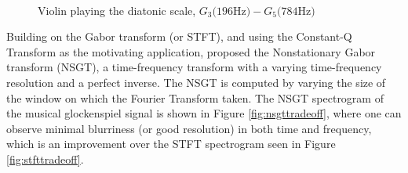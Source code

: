 \documentclass[report.tex]{subfiles}
\begin{document}
\begin{figure}[ht]
	\centering
	\\
	\caption{Violin playing the diatonic scale, $G_{3} \text{(196Hz)} - G_{5} \text{(784Hz)}$ \parencite[430]{jbrown}}
	\label{fig:violin}
\end{figure}

Building on the Gabor transform (or STFT), and using the Constant-Q Transform as the motivating application, \textcite{balazs} proposed the Nonstationary Gabor transform (NSGT), a time-frequency transform with a varying time-frequency resolution and a perfect inverse. The NSGT is computed by varying the size of the window on which the Fourier Transform taken. The NSGT spectrogram of the musical glockenspiel signal is shown in Figure \ref{fig:nsgttradeoff}, where one can observe minimal blurriness (or good resolution) in both time and frequency, which is an improvement over the STFT spectrogram seen in Figure \ref{fig:stfttradeoff}.
\end{document}
